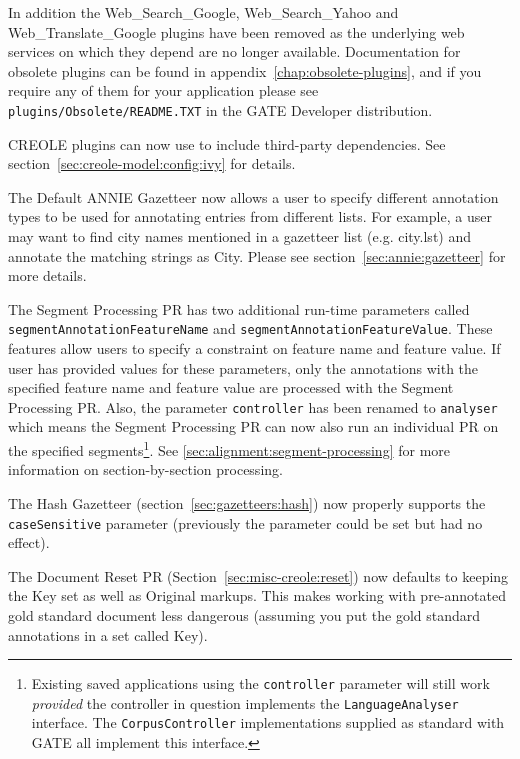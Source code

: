 In addition the Web\_Search\_Google, Web\_Search\_Yahoo and
Web\_Translate\_Google plugins have been removed as the underlying web services
on which they depend are no longer available.  Documentation for obsolete
plugins can be found in appendix~\ref{chap:obsolete-plugins}, and if you
require any of them for your application please see
\verb|plugins/Obsolete/README.TXT| in the GATE Developer distribution.


CREOLE plugins can now use  to
include third-party dependencies. See section~\ref{sec:creole-model:config:ivy} for details.

The Default ANNIE Gazetteer now allows a user to specify different annotation
types to be used for annotating entries from different lists. For example, a
user may want to find city names mentioned in a gazetteer list (e.g. city.lst)
and annotate the matching strings as City. Please see
section~\ref{sec:annie:gazetteer} for more details.

The Segment Processing PR has two additional run-time parameters called
\texttt{segmentAnnotationFeatureName} and
\texttt{segmentAnnotationFeatureValue}.  These features allow users to specify
a constraint on feature name and feature value.  If user has provided values
for these parameters, only the annotations with the specified feature name and
feature value are processed with the Segment Processing PR.  Also, the
parameter \texttt{controller} has been renamed to \texttt{analyser} which means
the Segment Processing PR can now also run an individual PR on the specified
segments\footnote{Existing saved applications using the \texttt{controller}
parameter will still work \emph{provided} the controller in question implements
the \texttt{LanguageAnalyser} interface.  The \texttt{CorpusController}
implementations supplied as standard with GATE all implement this interface.}.
See \ref{sec:alignment:segment-processing} for more information on
section-by-section processing.

The Hash Gazetteer (section~\ref{sec:gazetteers:hash}) now properly supports
the \texttt{caseSensitive} parameter (previously the parameter could be set but
had no effect).

The Document Reset PR (Section~\ref{sec:misc-creole:reset}) now defaults to
keeping the Key set as well as Original markups. This makes working with
pre-annotated gold standard document less dangerous (assuming you put the gold
standard annotations in a set called Key).

